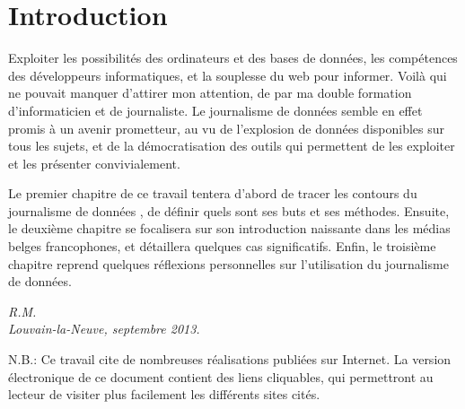 
\chapter*{Introduction}

Exploiter les possibilités des ordinateurs et des bases de données, les compétences des 
développeurs informatiques,
et la souplesse du web pour informer. Voilà qui ne pouvait manquer d'attirer mon 
attention, de par ma double formation d'informaticien et de journaliste. Le journalisme 
de données semble en effet promis à un avenir prometteur, au vu de l'explosion de données 
disponibles sur tous les sujets, et de la démocratisation des outils qui permettent de 
les exploiter et les présenter convivialement.

Le premier chapitre de ce travail tentera d'abord de tracer les contours du  \og journalisme de données \fg, de définir quels sont ses buts et ses méthodes. Ensuite, le deuxième chapitre se focalisera sur son introduction naissante dans les médias belges francophones, et détaillera quelques cas significatifs. Enfin, le troisième chapitre reprend quelques réflexions personnelles sur l'utilisation du journalisme de données.

\vfill

\begin{flushright}
\em
R.M.
\\ Louvain-la-Neuve, septembre 2013. 
\em
\end{flushright}

\vfill

\small
N.B.: Ce travail cite de nombreuses réalisations publiées sur Internet. La version 
électronique de ce document contient des liens cliquables, qui permettront au lecteur 
de visiter plus facilement les différents sites cités.
\normalsize
